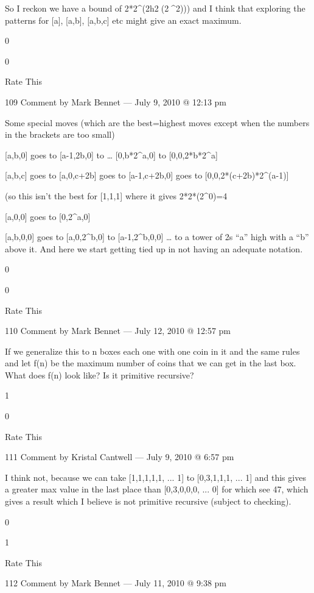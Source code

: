{    So I reckon we have a bound of 2*2^(2^^(2^^^(2^^^^2))) and I think that exploring the patterns for [a], [a,b], [a,b,c] etc might give an exact maximum.
     
    0
     
    0
     
    Rate This

   109  Comment by Mark Bennet — July 9, 2010 @ 12:13 pm

        Some special moves (which are the best=highest moves except when the numbers in the brackets are too small)

        [a,b,0] goes to [a-1,2b,0] to … [0,b*2^a,0] to [0,0,2*b*2^a]

        [a,b,c] goes to [a,0,c+2b]
        goes to [a-1,c+2b,0]
        goes to [0,0,2*(c+2b)*2^(a-1)]

        (so this isn’t the best for [1,1,1] where it gives 2*2*(2^0)=4

        [a,0,0] goes to [0,2^a,0]

        [a,b,0,0] goes to [a,0,2^b,0] to [a-1,2^b,0,0] … to a tower of 2s “a” high with a “b” above it.
        And here we start getting tied up in not having an adequate notation.
         
        0
         
        0
         
        Rate This

        110 Comment by Mark Bennet — July 12, 2010 @ 12:57 pm

    If we generalize this to n boxes each one with one coin in it and the same rules and let f(n) be the maximum number of coins that we can get in the last box. What does f(n) look like? Is it primitive recursive?
     
    1
     
    0
     
    Rate This

    111 Comment by Kristal Cantwell — July 9, 2010 @ 6:57 pm

        I think not, because we can take [1,1,1,1,1, ... 1] to [0,3,1,1,1, ... 1] and this gives a greater max value in the last place than
        [0,3,0,0,0, ... 0] for which see 47, which gives a result which I believe is not primitive recursive (subject to checking).
         
        0
         
        1
         
        Rate This

        112 Comment by Mark Bennet — July 11, 2010 @ 9:38 pm

}
